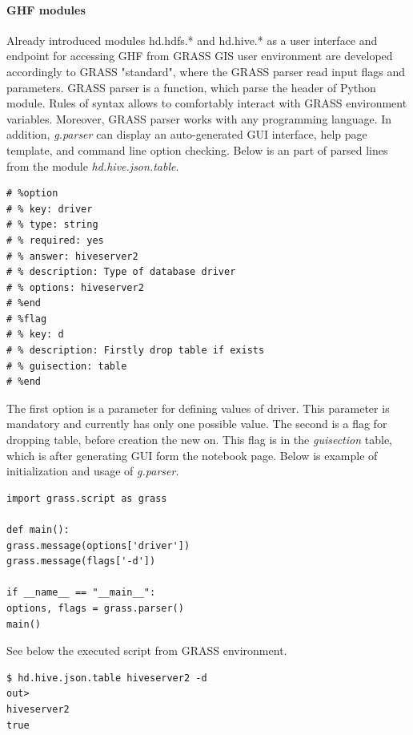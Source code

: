 \documentclass[a4paper,12pt,oneside]{report}
\begin{document}
	\paragraph{GHF modules}
	Already introduced modules hd.hdfs.* and hd.hive.* as a user interface and endpoint
	for accessing GHF from GRASS GIS user environment are developed accordingly to
	GRASS "standard", where the GRASS parser read input flags and parameters. GRASS
	parser is a function, which parse the header of Python module.  Rules of syntax
	allows to comfortably interact with GRASS environment variables. Moreover, GRASS
	parser works with any programming language. In addition, \textit{g.parser} can display
	an auto-generated GUI interface, help page template, and command line option
	checking. 
	Below is an part of parsed lines from the module \textit{hd.hive.json.table}.
	\begin{footnotesize}
		\begin{lstlisting}[style=python]
# %option
# % key: driver
# % type: string
# % required: yes
# % answer: hiveserver2
# % description: Type of database driver
# % options: hiveserver2
# %end
# %flag
# % key: d
# % description: Firstly drop table if exists
# % guisection: table
# %end
		\end{lstlisting}
	\end{footnotesize}
	The first option is a parameter for defining values of driver. This parameter is
	mandatory and currently has only one possible value. The second is a flag for
	dropping table, before creation the new on. This flag is in the
	\textit{guisection} table, which is after generating GUI form the notebook
	page. Below is example of initialization and usage of \textit{g.parser}.
	\begin{footnotesize}
		\begin{lstlisting}[style=python]
import grass.script as grass

def main():
grass.message(options['driver'])
grass.message(flags['-d'])

if __name__ == "__main__":
options, flags = grass.parser()
main()
		\end{lstlisting}
	\end{footnotesize}
	See below the executed script from GRASS environment.
	\begin{footnotesize}
		\begin{lstlisting}[style=python]
$ hd.hive.json.table hiveserver2 -d
out> 
hiveserver2
true
		\end{lstlisting}
	\end{footnotesize}
	
\end{document}
